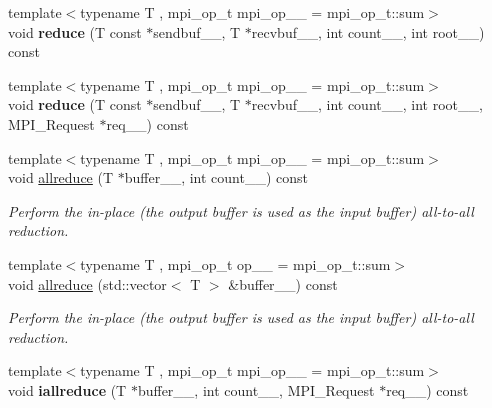 \begin{DoxyCompactItemize}
\item 
\hypertarget{classsddk_1_1_communicator_aabb450021af6bdcfd139f34f2acd25f1}{}{\footnotesize template$<$typename T , mpi\+\_\+op\+\_\+t mpi\+\_\+op\+\_\+\+\_\+ = mpi\+\_\+op\+\_\+t\+::sum$>$ }\\void {\bfseries reduce} (T const $\ast$sendbuf\+\_\+\+\_\+, T $\ast$recvbuf\+\_\+\+\_\+, int count\+\_\+\+\_\+, int root\+\_\+\+\_\+) const \label{classsddk_1_1_communicator_aabb450021af6bdcfd139f34f2acd25f1}

\item 
\hypertarget{classsddk_1_1_communicator_a353f80d1ac11b703e48b8100782982af}{}{\footnotesize template$<$typename T , mpi\+\_\+op\+\_\+t mpi\+\_\+op\+\_\+\+\_\+ = mpi\+\_\+op\+\_\+t\+::sum$>$ }\\void {\bfseries reduce} (T const $\ast$sendbuf\+\_\+\+\_\+, T $\ast$recvbuf\+\_\+\+\_\+, int count\+\_\+\+\_\+, int root\+\_\+\+\_\+, M\+P\+I\+\_\+\+Request $\ast$req\+\_\+\+\_\+) const \label{classsddk_1_1_communicator_a353f80d1ac11b703e48b8100782982af}

\item 
{\footnotesize template$<$typename T , mpi\+\_\+op\+\_\+t mpi\+\_\+op\+\_\+\+\_\+ = mpi\+\_\+op\+\_\+t\+::sum$>$ }\\void \hyperlink{classsddk_1_1_communicator_a1300606fc1ca6d6feba65a9a6d81e2f7}{allreduce} (T $\ast$buffer\+\_\+\+\_\+, int count\+\_\+\+\_\+) const 
\begin{DoxyCompactList}\small\item\em Perform the in-\/place (the output buffer is used as the input buffer) all-\/to-\/all reduction. \end{DoxyCompactList}\item 
{\footnotesize template$<$typename T , mpi\+\_\+op\+\_\+t op\+\_\+\+\_\+ = mpi\+\_\+op\+\_\+t\+::sum$>$ }\\void \hyperlink{classsddk_1_1_communicator_a4416faf4f98a33416b01caa5206cb551}{allreduce} (std\+::vector$<$ T $>$ \&buffer\+\_\+\+\_\+) const 
\begin{DoxyCompactList}\small\item\em Perform the in-\/place (the output buffer is used as the input buffer) all-\/to-\/all reduction. \end{DoxyCompactList}\item 
\hypertarget{classsddk_1_1_communicator_a2631ce6eac19260e297a83c44eece278}{}{\footnotesize template$<$typename T , mpi\+\_\+op\+\_\+t mpi\+\_\+op\+\_\+\+\_\+ = mpi\+\_\+op\+\_\+t\+::sum$>$ }\\void {\bfseries iallreduce} (T $\ast$buffer\+\_\+\+\_\+, int count\+\_\+\+\_\+, M\+P\+I\+\_\+\+Request $\ast$req\+\_\+\+\_\+) const \label{classsddk_1_1_communicator_a2631ce6eac19260e297a83c44eece278}


\end{DoxyCompactItemize}
